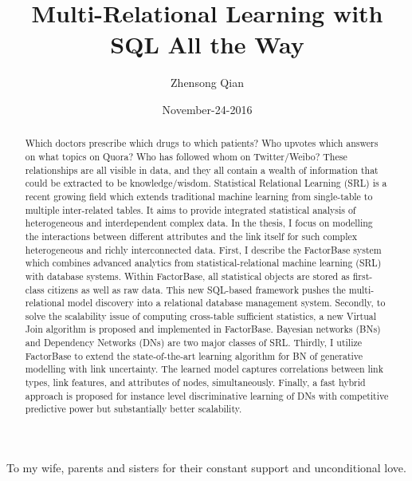 \documentclass{sfuthesis}
\title{Multi-Relational Learning with SQL All the Way}
\author{Zhensong Qian}
\date{November-24-2016}
\begin{document}
\frontmatter
\maketitle{}
\makecommittee{}

\begin{abstract}
Which doctors prescribe which drugs to which patients? Who upvotes which answers on what topics on Quora? Who has followed whom on Twitter/Weibo? These relationships are all visible in data, and they all contain a wealth of information that could be extracted to be knowledge/wisdom. Statistical Relational Learning (SRL) is a recent growing field which extends traditional machine learning from single-table to multiple inter-related tables. It aims to provide integrated statistical analysis of heterogeneous and interdependent complex data. In the thesis, I focus on modelling the interactions between different attributes and the link itself for such complex heterogeneous and richly interconnected data.
First, I describe the FactorBase system which combines advanced analytics from statistical-relational machine learning (SRL) with database systems. Within FactorBase, all statistical objects are stored as first-class citizens as well as  raw data. This new SQL-based framework pushes the multi-relational model discovery into a relational database management system. Secondly, to solve the scalability issue of computing cross-table sufficient statistics, a new Virtual Join algorithm is proposed and implemented in FactorBase. Bayesian networks (BNs) and Dependency Networks (DNs) are two major classes of SRL. Thirdly, I utilize FactorBase to extend the state-of-the-art learning algorithm for BN of generative modelling with link uncertainty. The learned model captures correlations between link types, link features, and attributes of nodes, simultaneously. Finally, a fast hybrid approach is proposed for instance level discriminative learning of DNs with competitive predictive power but substantially better  scalability.

\end{abstract}


\begin{dedication} 
To my wife, parents and sisters  for their constant support and unconditional love.
\end{dedication}
\end{document}
